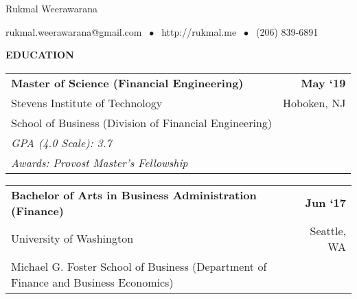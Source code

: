 \documentclass[10pt, letterpaper]{letter}
\newcommand{\highlightcolor}{RoyalBlue}
\newcommand{\sectionTitle}[1]{ \vspace{1em} \raggedright{ \color{\highlightcolor} \large \textbf{ \uppercase{ #1}}}}
\begin{document}
    \centerline{ \color{\highlightcolor} \huge Rukmal Weerawarana}

    \vspace{.5em}

    {\color{\highlightcolor} \centerline{rukmal.weerawarana@gmail.com $\; \bullet \;$ http://rukmal.me $\; \bullet \;$ (206) 839-6891} }

    \noindent{\rule{\linewidth}{.2em}}


    \sectionTitle{Education}

    
        \begin{tabularx}{\textwidth}{X r}
            \textbf{Master of Science (Financial Engineering)} & \textbf{
    May ‘19} \\
            \quad Stevens Institute of Technology & 
    Hoboken, 
        NJ \\
            \quad School of Business (Division of Financial Engineering) & \\
            
                \quad \textit{GPA (4.0 Scale): 3.7} & \\
            
            
                
                    
                        \quad \textit{Awards: 
    Provost Master's Fellowship} & \\
                    
                
            
        \end{tabularx}
    
        \begin{tabularx}{\textwidth}{X r}
            \textbf{Bachelor of Arts in Business Administration (Finance)} & \textbf{
    Jun ‘17} \\
            \quad University of Washington & 
    Seattle, 
        WA \\
            \quad Michael G. Foster School of Business (Department of Finance and Business Economics) & \\
            
            
        \end{tabularx}
    
\end{document}

